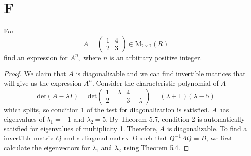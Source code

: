 \documentclass[11pt]{scrartcl}
\begin{document}
\section{F}
For
$$A=\left(\begin{array}{ll}1 & 4 \\ 2 & 3\end{array}\right) \in \mathrm{M}_{2 \times 2}(R)$$
find an expression for $A^{n},$ where $n$ is an arbitrary positive integer.
\begin{proof}
	We claim that $A$ is diagonalizable and we can find invertible matrices that will give us the expression $A^{n}$.
	Consider the characteristic polynomial of $A$
	\[
		\text{det}(A - \lambda I ) = \text{det}\left(\begin{array}{ll}1 - \lambda & 4 \\ 2 & 3 - \lambda  \end{array}\right)
		= (\lambda + 1)(\lambda-5)
	\]
	which splits, so condition 1 of the test for diagonalization is satisfied.
	$A$ has eigenvalues of $\lambda_1 = -1 $ and $\lambda_2 = 5 $. By Theorem 5.7, condition 2
	is automatically satisfied for eigenvalues of multiplicity 1. Therefore, $A$ is diagonalizable.
	To find a invertible matrix $Q$ and a diagonal matrix $D$ such that $Q^{-1} A Q=D$, we first
	calculate the eigenvectors for $\lambda_1$ and $\lambda_2$ using Theorem 5.4.


\end{proof}
\end{document}
